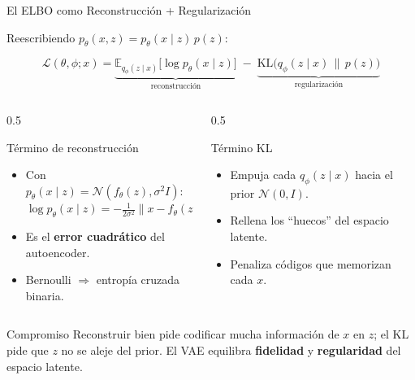 \documentclass[aspectratio=169, 10pt]{beamer}
\providecommand{\E}{\mathbb{E}}
\newcommand{\KL}{\mathrm{KL}}
\newcommand{\formula}[1]{%
	\begin{tcolorbox}[colback=UCMBlue!8, colframe=UCMBlue, arc=4pt,
		boxsep=2pt, left=6pt, right=6pt, top=3pt, bottom=3pt]
		#1
	\end{tcolorbox}
}
\begin{document}
\begin{frame}[shrink]{El ELBO como Reconstrucci\'on + Regularizaci\'on}

	Reescribiendo $p_\theta(x,z) = p_\theta(x\mid z)\,p(z)$:

	\formula{
		\[
		\mathcal{L}(\theta,\phi;x) =
		\underbrace{\E_{q_\phi(z\mid x)}\big[\log p_\theta(x \mid z)\big]}_{\text{reconstrucci\'on}}
		\;-\;
		\underbrace{\KL\big(q_\phi(z\mid x)\,\|\,p(z)\big)}_{\text{regularizaci\'on}}
		\]
	}

	\begin{columns}[T]
		\begin{column}{0.5\textwidth}
			\begin{block}{T\'ermino de reconstrucci\'on}
				\small
				\begin{itemize}
					\item Con $p_\theta(x\mid z) = \mathcal{N}(f_\theta(z), \sigma^2 I)$:
					\[
					\log p_\theta(x\mid z) = -\tfrac{1}{2\sigma^2}\|x - f_\theta(z)\|^2 + \text{cte}
					\]
					\item Es el \textbf{error cuadr\'atico} del autoencoder.
					\item Bernoulli $\Rightarrow$ entrop\'ia cruzada binaria.
				\end{itemize}
			\end{block}
		\end{column}

		\begin{column}{0.5\textwidth}
			\begin{block}{T\'ermino KL}
				\small
				\begin{itemize}
					\item Empuja cada $q_\phi(z\mid x)$ hacia el prior $\mathcal{N}(0,I)$.
					\item Rellena los ``huecos'' del espacio latente.
					\item Penaliza c\'odigos que memorizan cada $x$.
				\end{itemize}
			\end{block}
		\end{column}
	\end{columns}

	\vspace{0.2cm}

	\begin{alertblock}{Compromiso}
		Reconstruir bien pide codificar mucha informaci\'on de $x$ en $z$; el KL pide que $z$ no se aleje del prior. El VAE equilibra \textbf{fidelidad} y \textbf{regularidad} del espacio latente.
	\end{alertblock}

\end{frame}
\end{document}
